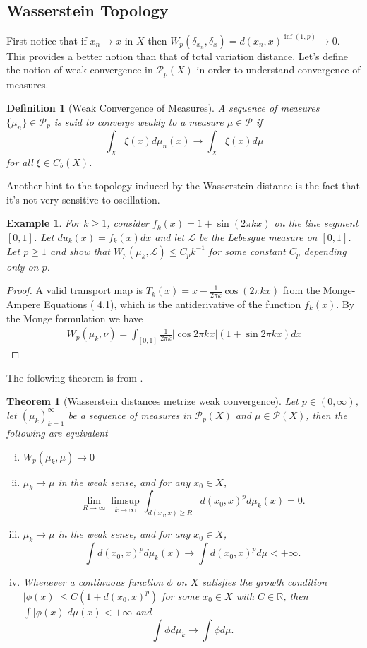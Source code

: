 \documentclass[12pt]{article}
\newcommand{\R}{\mathbb{R}}
\theoremstyle{plain}
\newtheorem{thm}{Theorem}[section]
\newtheorem{defn}{Definition}[section]
\newtheorem{exmp}{Example}[section]
\numberwithin{equation}{section}
\begin{document}
\subsection{Wasserstein Topology}
First notice that if $x_n\to x$ in $X$ then
\(W_p(\delta_{x_n},\delta_x) = d(x_n,x)^{\inf{(1,p)}} \to 0\). This provides a better notion than that of total variation distance.
Let's define the notion of weak convergence in $\mathcal{P}_p(X)$ in order to understand convergence of measures.
\begin{defn}[Weak Convergence of Measures]
  A sequence of measures $\{\mu_n\} \in\mathcal{P}_p$ is said to converge weakly to a measure $\mu\in\mathcal{P}$ if 
  \[\int_X \xi(x)d\mu_n(x) \to \int_X \xi(x)d\mu\]
  for all $\xi\in C_b(X)$.
\end{defn}
Another hint to the topology induced by the Wasserstein distance is the fact that it's not very sensitive to oscillation.
\begin{exmp}
  For $k\ge 1$, consider $f_k(x)=1+\sin(2\pi k x)$ on the line segment $[0,1]$. Let $du_k(x) = f_k(x)dx$ and let $\mathcal{L}$ be the Lebesgue measure on $[0,1]$. Let $p\ge 1$ and show that $W_p(\mu_k,\mathcal{L}) \le C_pk^{-1}$ for some constant $C_p$ depending only on $p$.
\end{exmp}
\begin{proof}
  A valid transport map is $ T_k(x) = x - \frac{1}{2\pi k}\cos{(2\pi k x)}$ from the Monge-Ampere Equations (\cite{villani} 4.1), which is the antiderivative of the function $f_k(x)$. By the Monge formulation we have
  \begin{align*}
    W_p(\mu_k,\nu) = \int_{[0,1]}\frac{1}{2\pi k}|\cos{2\pi kx}|(1+\sin{2\pi k x})dx
  \end{align*}
\end{proof}
The following theorem is from \cite{villani}.
\begin{thm}[Wasserstein distances metrize weak convergence]\label{thm:weak}
	Let $p\in(0,\infty)$, let $(\mu_k)_{k=1}^\infty$ be a sequence of measures in $\mathcal{P}_p(X)$ and $\mu\in \mathcal{P}(X)$, then the following are equivalent
  	\begin{enumerate}[(i)]
		\item $W_p(\mu_k,\mu)\to 0$
		\item $\mu_k\to\mu$ in the weak sense, and for any $x_0\in X$, 
		\[\lim_{R\to\infty}\limsup_{k\to\infty} \int_{d(x_0,x)\ge R} d(x_0,x)^pd\mu_k(x) = 0.\]
    \item $\mu_k\to\mu$ in the weak sense, and for any $x_0\in X$, 
    \[\int d(x_0,x)^pd\mu_k(x) \to \int d(x_0,x)^pd\mu < +\infty.\]
    \item Whenever a continuous function $\phi$ on $X$ satisfies the growth condition $|\phi(x)| \le C(1+d(x_0,x)^p)$ for some $x_0\in X$ with $C\in \R$, then $\int |\phi(x)|d\mu(x) < +\infty$ and 
     \[\int \phi d\mu_k \to \int \phi d\mu.\]
	\end{enumerate} 
\end{thm}
\end{document}
